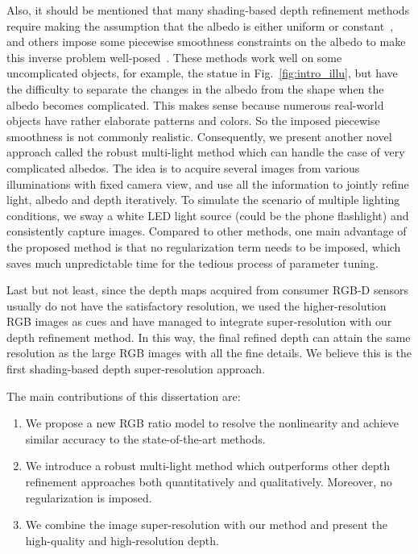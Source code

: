Also, it should be mentioned that many shading-based depth refinement methods require making the assumption that the albedo is either uniform or constant~\cite{wu2011shading, han2013high, park2013multiview, haque2014high, queau2017dense}, and others impose some piecewise smoothness constraints on the albedo to make this inverse problem well-posed~\cite{or2015rgbd, or2016real, kim2015joint, wu2014real}.
These methods work well on some uncomplicated objects, for example, the statue in Fig.~\ref{fig:intro_illu}, but have the difficulty to separate the changes in the albedo from the shape when the albedo becomes complicated. This makes sense because numerous real-world objects have rather elaborate patterns and colors.
So the imposed piecewise smoothness is not commonly realistic.
Consequently, we present another novel approach called the robust multi-light method which can handle the case of very complicated albedos.
The idea is to acquire several images from various illuminations with fixed camera view, and use all the information to jointly refine light, albedo and depth iteratively.
To simulate the scenario of multiple lighting conditions, we sway a white LED light source (could be the phone flashlight) and consistently capture images. 
Compared to other methods, one main advantage of the proposed method is that no regularization term needs to be imposed, which saves much unpredictable time for the tedious process of parameter tuning.

Last but not least, since the depth maps acquired from consumer RGB-D sensors usually do not have the satisfactory resolution, we used the higher-resolution RGB images as cues and have managed to integrate super-resolution with our depth refinement method.
In this way, the final refined depth can attain the same resolution as the large RGB images with all the fine details.
We believe this is the first shading-based depth super-resolution approach.

The main contributions of this dissertation are:
\begin{enumerate}
    \item We propose a new RGB ratio model to resolve the nonlinearity and achieve similar accuracy to the state-of-the-art methods.
    \item We introduce a robust multi-light method which outperforms other depth refinement approaches both quantitatively and qualitatively. Moreover, no regularization is imposed.
    \item We combine the image super-resolution with our method and present the high-quality and high-resolution depth.
\end{enumerate}


